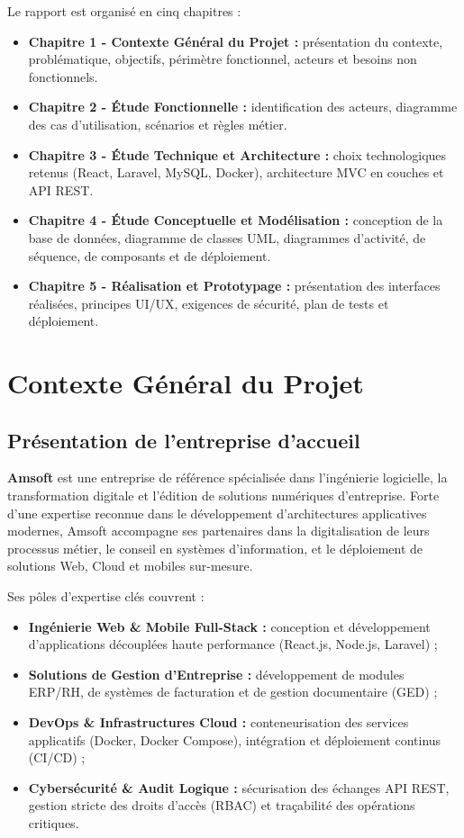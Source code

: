\documentclass[12pt,a4paper]{report}
\begin{document}
Le rapport est organisé en cinq chapitres :
\begin{itemize}
    \item \textbf{Chapitre 1 - Contexte Général du Projet :} présentation du contexte, problématique, objectifs, périmètre fonctionnel, acteurs et besoins non fonctionnels.
    \item \textbf{Chapitre 2 - Étude Fonctionnelle :} identification des acteurs, diagramme des cas d'utilisation, scénarios et règles métier.
    \item \textbf{Chapitre 3 - Étude Technique et Architecture :} choix technologiques retenus (React, Laravel, MySQL, Docker), architecture MVC en couches et API REST.
    \item \textbf{Chapitre 4 - Étude Conceptuelle et Modélisation :} conception de la base de données, diagramme de classes UML, diagrammes d'activité, de séquence, de composants et de déploiement.
    \item \textbf{Chapitre 5 - Réalisation et Prototypage :} présentation des interfaces réalisées, principes UI/UX, exigences de sécurité, plan de tests et déploiement.
\end{itemize}

\chapter{Contexte Général du Projet}

\section{Présentation de l'entreprise d'accueil}
\textbf{Amsoft} est une entreprise de référence spécialisée dans l'ingénierie logicielle, la transformation digitale et l'édition de solutions numériques d'entreprise. Forte d'une expertise reconnue dans le développement d'architectures applicatives modernes, Amsoft accompagne ses partenaires dans la digitalisation de leurs processus métier, le conseil en systèmes d'information, et le déploiement de solutions Web, Cloud et mobiles sur-mesure.

Ses pôles d'expertise clés couvrent :
\begin{itemize}
    \item \textbf{Ingénierie Web \& Mobile Full-Stack :} conception et développement d'applications découplées haute performance (React.js, Node.js, Laravel) ;
    \item \textbf{Solutions de Gestion d'Entreprise :} développement de modules ERP/RH, de systèmes de facturation et de gestion documentaire (GED) ;
    \item \textbf{DevOps \& Infrastructures Cloud :} conteneurisation des services applicatifs (Docker, Docker Compose), intégration et déploiement continus (CI/CD) ;
    \item \textbf{Cybersécurité \& Audit Logique :} sécurisation des échanges API REST, gestion stricte des droits d'accès (RBAC) et traçabilité des opérations critiques.
\end{itemize}
\end{document}
